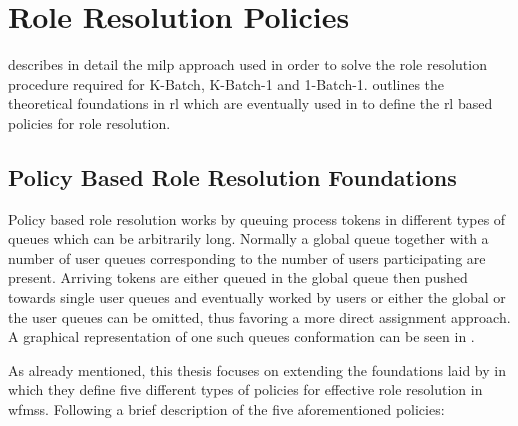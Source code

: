 \chapter{Role Resolution Policies}
\label{ch:policies}

 describes in detail the \gls{milp} approach used in order to solve the role resolution procedure required for K-Batch, K-Batch-1 and 1-Batch-1.  outlines the theoretical foundations in \gls{rl} which are eventually used in  to define the \gls{rl} based policies for role resolution.

\section{Policy Based Role Resolution Foundations}
\label{sec:pol_rol_res_basics}

Policy based role resolution works by queuing process tokens in different types of queues which can be arbitrarily long. Normally a global queue together with a number of user queues corresponding to the number of users participating are present. Arriving tokens are either queued in the global queue then pushed towards single user queues and eventually worked by users or either the global or the user queues can be omitted, thus favoring a more direct assignment approach. A graphical representation of one such queues conformation can be seen in .


As already mentioned, this thesis focuses on extending the foundations laid by \citet[p. 7]{Zeng2005} in which they define five different types of policies for effective role resolution in \glspl{wfms}. Following a brief description of the five aforementioned policies:

